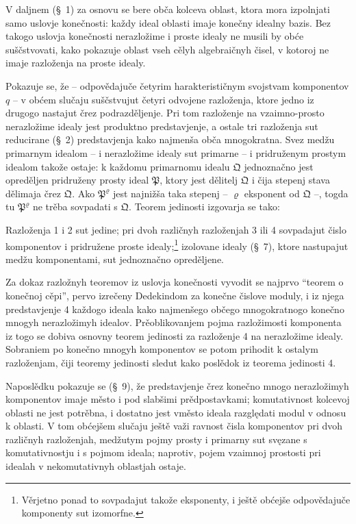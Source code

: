 \documentclass[11pt]{article}
\newcommand{\ideal}[1]{\mathfrak{#1}}
\begin{document}
V daljnem (\S~1) za osnovu se bere obča kolceva oblast, ktora mora izpolnjati samo uslovje konečnosti: každy ideal oblasti imaje konečny idealny bazis. Bez takogo uslovja konečnosti nerazložime i proste idealy ne musili by obće suščstvovati, kako pokazuje oblast vseh cělyh algebraičnyh čisel, v kotoroj ne imaje razloženja na proste idealy.

Pokazuje se, že -- odpovědajuče četyrim harakterističnym svojstvam komponentov \(q\) -- v obćem slučaju suščstvujut četyri odvojene razloženja, ktore jedno iz drugogo nastajut črez podrazděljenje. Pri tom razloženje na vzaimno-prosto nerazložime idealy jest produktno predstavjenje, a ostale tri razloženja sut reducirane (\S~2) predstavjenja kako najmenša obča mnogokratna. Svez medžu primarnym idealom -- i nerazložime idealy sut primarne -- i pridruženym prostym idealom takože ostaje: k každomu primarnomu idealu \(\ideal Q\) jednoznačno jest opreděljen pridruženy prosty ideal \(\ideal P\), ktory jest dělitelj \(\ideal Q\) i čija stepenj stava dělimaja črez \(\ideal Q\). Ako \(\ideal P^\varrho\) jest najnižša taka stepenj -- \(\varrho\) eksponent od \(\ideal Q\) --, togda tu \(\ideal P^\varrho\) ne trěba sovpadati s \(\ideal Q\). Teorem jedinosti izgovarja se tako:

Razloženja 1 i 2 sut jedine; pri dvoh različnyh razloženjah 3 ili 4 sovpadajut čislo komponentov i pridružene proste idealy;\footnote{Věrjetno ponad to sovpadajut takože eksponenty, i ještě obćejše odpovědajuče komponenty sut izomorfne.} izolovane idealy (\S~7), ktore nastupajut medžu komponentami, sut jednoznačno opreděljene.

Za dokaz razložnyh teoremov iz uslovja konečnosti vyvodit se najprvo ``teorem o konečnoj cěpi'', pervo izrečeny Dedekindom za konečne čislove moduly, i iz njega predstavjenje 4 každogo ideala kako najmenšego občego mnogokratnogo konečno mnogyh nerazložimyh idealov. Prěoblikovanjem pojma razložimosti komponenta iz togo se dobiva osnovny teorem jedinosti za razloženje 4 na nerazložime idealy. Sobraniem po konečno mnogyh komponentov se potom prihodit k ostalym razloženjam, čiji teoremy jedinosti sledut kako poslědok iz teorema jedinosti 4.

Naposlědku pokazuje se (\S~9), že predstavjenje črez konečno mnogo nerazložimyh komponentov imaje město i pod slabšimi prědpostavkami; komutativnost kolcevoj oblasti ne jest potrěbna, i dostatno jest vměsto ideala razględati modul v odnosu k oblasti. V tom obćejšem slučaju ještě važi ravnost čisla komponentov pri dvoh različnyh razloženjah, medžutym pojmy prosty i primarny sut svęzane s komutativnostju i s pojmom ideala; naprotiv, pojem vzaimnoj prostosti pri idealah v nekomutativnyh oblastjah ostaje.
\end{document}
